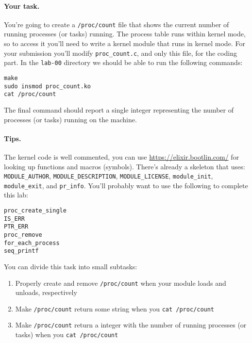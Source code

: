 \paragraph{Your task.}

You're going to create a \lstinline|/proc/count| file that shows the current
number of running processes (or tasks) running.
The process table runs within kernel mode, so to access it you'll need to write
a kernel module that runs in kernel mode.
For your submission you'll modify \lstinline|proc_count.c|, and only this file,
for the coding part.
In the \lstinline|lab-00| directory we should be able to run the following
commands:

\begin{lstlisting}[xleftmargin=2em]
make
sudo insmod proc_count.ko
cat /proc/count 
\end{lstlisting}

\noindent
The final command should report a single integer representing the number of
processes (or tasks) running on the machine.

\paragraph{Tips.}

The kernel code is well commented, you can use \url{https://elixir.bootlin.com/}
for looking up functions and macros (symbols). There's already a skeleton that
uses: \lstinline|MODULE_AUTHOR|, \lstinline|MODULE_DESCRIPTION|,
\lstinline|MODULE_LICENSE|, \lstinline|module_init|, \lstinline|module_exit|,
and \lstinline|pr_info|.
You'll probably want to use the following to complete this lab:

\begin{lstlisting}[xleftmargin=2em]
proc_create_single
IS_ERR
PTR_ERR
proc_remove
for_each_process
seq_printf
\end{lstlisting}

\noindent
You can divide this task into small subtasks:

\begin{enumerate}
  \item Properly create and remove \lstinline|/proc/count| when your module
        loads and unloads, respectively
  \item Make \lstinline|/proc/count| return some string when you
        \lstinline|cat /proc/count|
  \item Make \lstinline|/proc/count| return a integer with the number of running
        processes (or tasks) when you \lstinline|cat /proc/count|
\end{enumerate}

